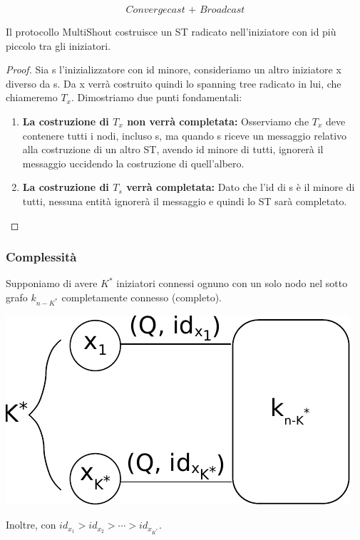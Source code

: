 $$
    \textit{Convergecast + Broadcast}
$$

\begin{theorem}
    Il protocollo MultiShout costruisce un ST radicato nell'iniziatore con
    id più piccolo tra gli iniziatori.
\end{theorem}

\begin{proof}
    Sia s l'inizializzatore con id minore, consideriamo un altro iniziatore x
    diverso da s. Da x verrà costruito quindi lo spanning tree radicato in lui,
    che chiameremo $T_x$. Dimostriamo due punti fondamentali:
    \begin{enumerate}
        \item \textbf{La costruzione di $T_x$ non verrà completata:} Osserviamo che
              $T_x$ deve contenere tutti i nodi, incluso s, ma quando s riceve un
              messaggio relativo alla costruzione di un altro ST, avendo id minore di
              tutti, ignorerà il messaggio uccidendo la costruzione di quell'albero.
        \item \textbf{La costruzione di $T_s$ verrà completata:} Dato che l'id di s
              è il minore di tutti, nessuna entità ignorerà il messaggio e quindi lo ST
              sarà completato.
    \end{enumerate}
\end{proof}

\subsubsection{Complessità}
Supponiamo di avere $K^*$ iniziatori connessi ognuno con un solo nodo nel sotto
grafo $k_{n-K^*}$ completamente connesso (completo).
\begin{center}
    \includegraphics[scale=0.9]{images/n_39}
\end{center}
Inoltre, con $id_{x_1} > id_{x_2} > \cdots > id_{x_{K^*}}$.

